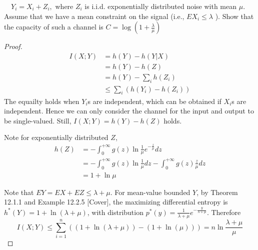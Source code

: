 \begin{exercise}{ $\quad Y_{i}=X_{i}+Z_{i},$ where $Z_{i}$ is i.i.d. exponentially distributed noise with mean $\mu$. Assume that we have a mean constraint on the signal (i.e., $E X_{i} \leq \lambda$ ). Show that the capacity of such a channel is $C=\log \left(1+\frac{\lambda}{\mu}\right)$}
  \begin{proof}
  \begin{equation}
    \begin{aligned}
      I(X;Y) &= h(Y) - h(Y|X) \\
      &= h(Y) - h(Z)\\
      &= h(Y) - \sum_i h(Z_i) \\
      &\le \sum_i \left(h(Y_i) - h(Z_i)\right)
    \end{aligned}
  \end{equation}
  The equailty holds when $Y_i$s are independent, which can be obtained if $X_i$s are independent. Hence we can only consider the channel for the input and output to be single-valued. Still, $I(X;Y) = h(Y) - h(Z)$ holds.

  Note for exponentially distributed $Z$,
  \begin{equation}
    \begin{aligned}
      h(Z) &= - \int_{0}^{+\infty} g(z) \ln  \frac{1}{\mu} e^{-\frac{z}{\mu}}  dz \\
      &= - \int_{0}^{+\infty} g(z) \ln  \frac{1}{\mu}   dz - \int_{0}^{+\infty} g(z) \frac{z}{\mu}  dz \\
      &= 1 + \ln \mu 
    \end{aligned}
  \end{equation}

  Note that $EY = EX + EZ \le \lambda + \mu$.  For mean-value bounded $Y$, by Theorem 12.1.1 and Example 12.2.5 [Cover], the maximizing differential entropy is $h^{*}(Y) = 1 + \ln (\lambda + \mu)$, with distribution $p^{*}(y) = \frac{1}{\lambda + \mu} e^{- \frac{y}{\lambda + \mu}}$. Therefore
  \begin{equation}
    I(X;Y) \le \sum_{i=1}^{n} \left(\left(1 + \ln(\lambda + \mu)\right)- \left(1 + \ln(\mu)\right)\right) = n \ln \frac{\lambda + \mu}{\mu}
  \end{equation}


\end{proof}
\end{exercise}
